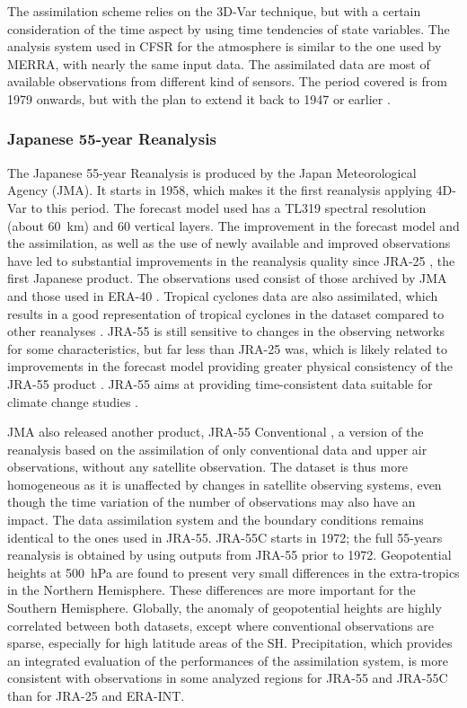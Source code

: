 \documentclass{ametsoc}
\begin{document}
The assimilation scheme relies on the 3D-Var technique, but with a certain consideration of the time aspect by using time tendencies of state variables. The analysis system used in CFSR for the atmosphere is similar to the one used by MERRA, with nearly the same input data. The assimilated data are most of available observations from different kind of sensors. The period covered is from 1979 onwards, but with the plan to extend it back to 1947 or earlier \citep{Saha2010a}.


\subsubsection{Japanese 55-year Reanalysis}

The Japanese 55-year Reanalysis \citep[JRA-55, ][]{Kobayashi2015, Harada2016} is produced by the Japan Meteorological Agency (JMA). It starts in 1958, which makes it the first reanalysis applying 4D-Var to this period. The forecast model used has a TL319 spectral resolution (about 60~km) and 60 vertical layers. The improvement in the forecast model and the assimilation, as well as the use of newly available and improved observations have led to substantial improvements in the reanalysis quality since JRA-25 \citep{Kobayashi2015, Harada2016}, the first Japanese product. The observations used consist of those archived by JMA and those used in ERA-40 \citep{Uppala2005}. Tropical cyclones data are also assimilated, which results in a good representation of tropical cyclones in the dataset compared to other reanalyses \citep{Harada2016}. JRA-55 is still sensitive to changes in the observing networks for some characteristics, but far less than JRA-25 was, which is likely related to improvements in the forecast model providing greater physical consistency of the JRA-55 product \citep{Kobayashi2015}. JRA-55 aims at providing time-consistent data suitable for climate change studies \citep{Ebita2011}.

JMA also released another product, JRA-55 Conventional \citep[JRA-55C,][]{Kobayashi2014}, a version of the reanalysis based on the assimilation of only conventional data and upper air observations, without any satellite observation. The dataset is thus more homogeneous as it is unaffected by changes in satellite observing systems, even though the time variation of the number of observations may also have an impact. The data assimilation system and the boundary conditions remains identical to the ones used in JRA-55. JRA-55C starts in 1972; the full 55-years reanalysis is obtained by using outputs from JRA-55 prior to 1972. Geopotential heights at 500~hPa are found to present very small differences in the extra-tropics in the Northern Hemisphere. These differences are more important for the Southern Hemisphere. Globally, the anomaly of geopotential heights are highly correlated between both datasets, except where conventional observations are sparse, especially for high latitude areas of the SH. Precipitation, which provides an integrated evaluation of the performances of the assimilation system, is more consistent with observations in some analyzed regions for JRA-55 and JRA-55C than for JRA-25 and ERA-INT.
\end{document}
